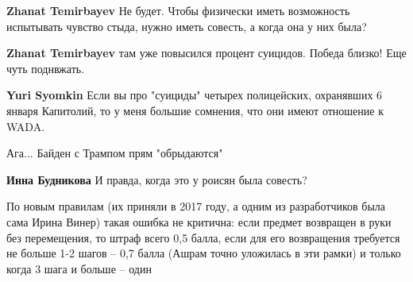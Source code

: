 \begin{itemize}
\begin{itemize}
 
\textbf{Zhanat Temirbayev} Не будет. Чтобы физически иметь возможность испытывать чувство стыда, нужно иметь совесть, а когда она у них была?

 
\textbf{Zhanat Temirbayev} там уже повысился процент суицидов. Победа близко! Еще чуть поднвжать.

 
\textbf{Yuri Syomkin} Если вы про "суициды" четырех полицейских, охранявших 6 января Капитолий, то у меня большие сомнения, что они имеют отношение к WADA.

 
Ага... Байден с Трампом прям "обрыдаются" 🤣

 
\textbf{Инна Будникова} И правда, когда это у роисян была совесть?

 
По новым правилам (их приняли в 2017 году, а одним из разработчиков была сама Ирина Винер) такая ошибка не критична: если предмет возвращен в руки без перемещения, то штраф всего 0,5 балла, если для его возвращения требуется не больше 1-2 шагов – 0,7 балла (Ашрам точно уложилась в эти рамки) и только когда 3 шага и больше – один


\end{itemize}
\end{itemize}
